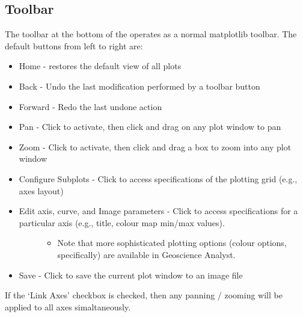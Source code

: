 \documentclass[letterpaper,10pt,english,openany,oneside]{sphinxmanual}
\begin{document}
\subsection{Toolbar}
\label{\detokenize{content/getting_started/GUI_overview:toolbar}}\label{\detokenize{content/getting_started/GUI_overview:id6}}
The toolbar at the bottom of the {\hyperref[\detokenize{content/getting_started/GUI_overview:plot-window}]{}} operates as a normal matplotlib toolbar.
The default buttons from left to right are:
\begin{itemize}
\item {} 
Home - restores the default view of all plots

\item {} 
Back - Undo the last modification performed by a toolbar button

\item {} 
Forward - Redo the last undone action

\item {} 
Pan - Click to activate, then click and drag on any plot window to pan

\item {} 
Zoom - Click to activate, then click and drag a box to zoom into any plot window

\item {} 
Configure Subplots - Click to access specifications of the plotting grid (e.g., axes layout)

\item {} \begin{description}
\item[{Edit axis, curve, and Image parameters - Click to access specifications for a particular axis (e.g., title, colour map min/max values).}] \leavevmode\begin{itemize}
\item {} 
Note that more sophisticated plotting options (colour options, specifically) are available in Geoscience Analyst.

\end{itemize}

\end{description}

\item {} 
Save - Click to save the current plot window to an image file

\end{itemize}

If the ‘Link Axes’ checkbox is checked, then any panning / zooming will be applied to all axes simaltaneously.
\end{document}
